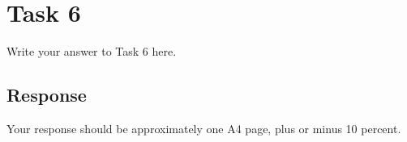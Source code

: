 
\section{Task 6}

Write your answer to Task 6 here.

\subsection{Response}

Your response should be approximately one A4 page, plus or minus 10 percent.
